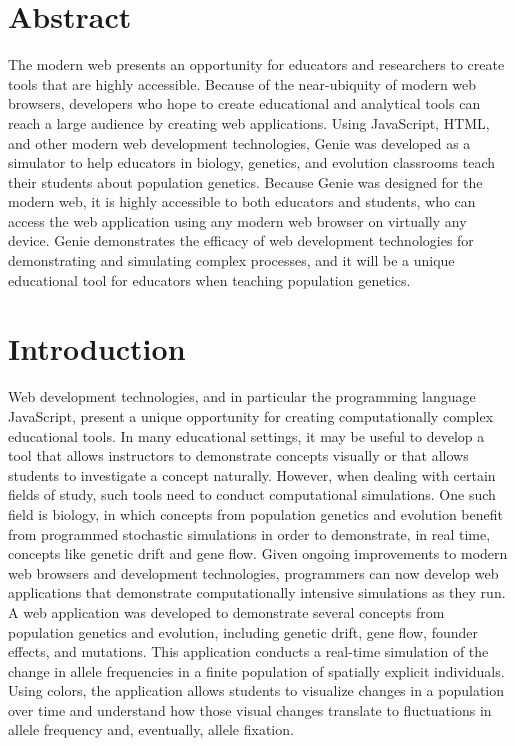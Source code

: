 \documentclass[12pt]{article}
\begin{document}
\begin{spacing}{1.6}

\section{Abstract}

The modern web presents an opportunity for educators and researchers to create tools that are highly accessible. Because of the near-ubiquity of modern web browsers, developers who hope to create educational and analytical tools can reach a large audience by creating web applications. Using JavaScript, HTML, and other modern web development technologies, Genie was developed as a simulator to help educators in biology, genetics, and evolution classrooms teach their students about population genetics. Because Genie was designed for the modern web, it is highly accessible to both educators and students, who can access the web application using any modern web browser on virtually any device. Genie demonstrates the efficacy of web development technologies for demonstrating and simulating complex processes, and it will be a unique educational tool for educators when teaching population genetics.

\section{Introduction}

Web development technologies, and in particular the programming language JavaScript, present a unique opportunity for creating computationally complex educational tools. In many educational settings, it may be useful to develop a tool that allows instructors to demonstrate concepts visually or that allows students to investigate a concept naturally. However, when dealing with certain fields of study, such tools need to conduct computational simulations. One such field is biology, in which concepts from population genetics and evolution benefit from programmed stochastic simulations in order to demonstrate, in real time, concepts like genetic drift and gene flow. Given ongoing improvements to modern web browsers and development technologies, programmers can now develop web applications that demonstrate computationally intensive simulations as they run. A web application was developed to demonstrate several concepts from population genetics and evolution, including genetic drift, gene flow, founder effects, and mutations. This application conducts a real-time simulation of the change in allele frequencies in a finite population of spatially explicit individuals. Using colors, the application allows students to visualize changes in a population over time and understand how those visual changes translate to fluctuations in allele frequency and, eventually, allele fixation.


\end{spacing}
\end{document}
